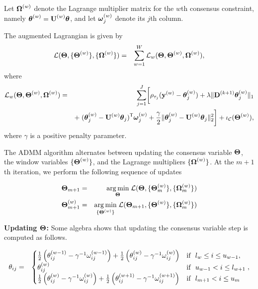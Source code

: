 \documentclass[12pt]{article}
\newcommand{\Tra}{^{\sf T}} %
\newcommand{\Inv}{^{-1}} %
\newcommand{\V}[1]{{\bm{\mathbf{\MakeLowercase{#1}}}}} %
\newcommand{\Vn}[2]{\V{#1}^{(#2)}} %
\newcommand{\M}[1]{{\bm{\mathbf{\MakeUppercase{#1}}}}} %
\newcommand{\ME}[2]{\MakeLowercase{#1}_{#2}} %
\newcommand{\Mn}[2]{\M{#1}^{(#2)}} %
\newcommand{\MnE}[3]{\MakeLowercase{#1}^{(#2)}_{#3}} %
\begin{document}
	 	 Let $\Mn{\Omega}{w}$ denote the Lagrange multiplier matrix for the $w$th consensus constraint, namely $\Mn{\theta}{w} = \Mn{U}{w}\M{\theta}$, and let $\Vn{\omega}{w}_{j}$ denote its $j$th column.
%

		  The augmented Lagrangian is given by
	 \begin{eqnarray*}
	 \mathcal{L}(\M{\Theta}, \{\Mn{\Theta}{w}\}, \{\Mn{\Omega}{w}\}) & = & \sum_{w=1}^W \mathcal{L}_w(\M{\Theta}, \Mn{\Theta}{w}, \Mn{\Omega}{w}),
\end{eqnarray*}
where
\begin{eqnarray*}
 \mathcal{L}_w(\M{\Theta}, \Mn{\Theta}{w}, \Mn{\Omega}{w}) & = & \sum_{j=1}^J \biggl [\rho_{\tau_j}(\Vn{y}{w} - \Vn{\theta}{w}_j)+\lambda \lVert \Mn{D}{k+1}\Vn{\theta}{w}_j\rVert_1 \\
	 && + \; (\Vn{\theta}{w}_j - \Mn{U}{w}\V{\theta}_{j})\Tra\Vn{\omega}{w}_{j} +
	 \frac{\gamma}{2}\lVert \Vn{\theta}{w}_j - \Mn{U}{w}\V{\theta}_{j}\rVert_2^2 \biggr ] + \iota_\mathcal{C}(\Mn{\Theta}{w}),
	 \end{eqnarray*}
	 where $\gamma$ is a positive penalty parameter.

The ADMM algorithm alternates between updating the consensus variable $\M{\Theta}$, the window variables $\{\Mn{\Theta}{w}\}$, and the Lagrange multipliers $\{\Mn{\Omega}{w}\}$.
At the $m+1$th iteration, we perform the following sequence of updates

\begin{eqnarray*}
	\M{\Theta}_{m+1} & = & \underset{\M{\Theta}}{\arg\min}\; \mathcal{L}(\M{\Theta}, \{\Mn{\Theta}{w}_m\}, \{\Mn{\Omega}{w}_m\}) \\
	\Mn{\Theta}{w}_{m+1} & = & \underset{\{\Mn{\Theta}{w}\}}{\arg\min}\; \mathcal{L}(\M{\Theta}_{m+1}, \{\Mn{\Theta}{w}\}, \{\Mn{\Omega}{w}_m\}) \\
\end{eqnarray*}

{\bf Updating $\M{\Theta}$: } Some algebra shows that updating the consensus variable step is computed as follows.

\begin{eqnarray}
\label{eq:update_consensus}
\ME{\theta}{ij}	 &=& \begin{cases}
			 \frac{1}{2}\left (\MnE{\theta}{w-1}{ij} - \gamma\Inv \MnE{\omega}{w-1}{ij} \right)
			 +
			 \frac{1}{2} \left (\MnE{\theta}{w}{ij} - \gamma\Inv \MnE{\omega}{w}{ij} \right)
			  & \mbox{if~~} l_{w} \le i \le u_{w-1},  \\
			 \MnE{\theta}{w}{ij} & \mbox{if~~} u_{w-1} < i \le l_{w+1}  \\
			 \frac{1}{2} \left ( \MnE{\theta}{w}{ij} - \gamma\Inv \MnE{\omega}{w}{ij}\right )
			 +
			 \frac{1}{2}	\left ( \MnE{\theta}{w+1}{ij} - \gamma\Inv \MnE{\omega}{w+1}{ij} \right )
			 & \mbox{if~~} l_{m+1} < i \le u_{m}
			 \end{cases},
\end{eqnarray}
\end{document}
